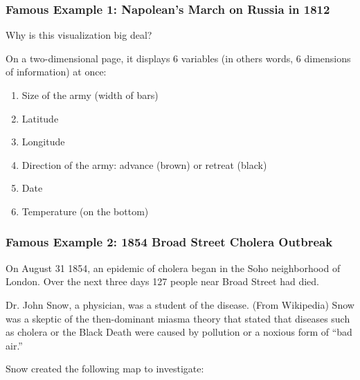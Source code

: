 \documentclass[handout]{beamer}
\newcommand{\blue}[1]{\textcolor{blue2}{#1}}
\begin{document}
\begin{frame}
\frametitle{Famous Example 1:  Napolean's March on Russia in 1812}
Why is this visualization big deal?

\vspace{0.5cm}

On a two-dimensional page, it displays 6 variables (in others words, 6 \blue{dimensions} of information) at once:
\begin{enumerate}
\pause \item Size of the army (width of bars)
\pause \item Latitude
\pause \item Longitude
\pause \item Direction of the army:  advance (brown) or retreat (black)
\pause \item Date
\pause \item Temperature (on the bottom)
\end{enumerate}

\end{frame}


\begin{frame}
\frametitle{Famous Example 2:  1854 Broad Street Cholera Outbreak}

On August 31 1854, an epidemic of cholera began in the Soho neighborhood of London.  Over the next three days 127 people near Broad Street had died.

\vspace{0.25cm}

\pause Dr. John Snow, a physician, was a student of the disease.  (From Wikipedia) Snow was a skeptic of the then-dominant \blue{miasma theory} that stated that diseases such as cholera or the Black Death were caused by pollution or a noxious form of ``bad air.'' 

\vspace{0.25cm}

\pause Snow created the following map to investigate:

\end{frame}
\end{document}

